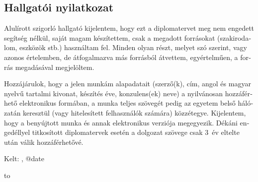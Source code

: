 \begin{otherlanguage}{magyar}

  \chapter*{Hallgatói nyilatkozat}
  \thispagestyle{plain}

  Alulírott \textbf{\authorihun} szigorló hallgató kijelentem, hogy ezt a diplomatervet meg nem engedett segítség nélkül, saját magam készítettem, csak a megadott forrásokat (szakirodalom, eszközök stb.) használtam fel. Minden olyan részt, melyet szó szerint, vagy azonos értelemben, de átfogalmazva más forrásból átvettem, egyértelműen, a forrás megadásával megjelöltem.

  Hozzájárulok, hogy a jelen munkám alapadatait (szerző(k), cím, angol és magyar nyelvű tartalmi kivonat, készítés éve, konzulens(ek) neve) a   nyilvánosan hozzáférhető elektronikus formában, a munka teljes szövegét pedig az egyetem belső hálózatán keresztül (vagy hitelesített felhasználók számára) közzétegye. Kijelentem, hogy a benyújtott munka és annak elektronikus verziója megegyezik. Dékáni engedéllyel titkosított diplomatervek esetén a dolgozat szövege csak 3~év eltelte után válik hozzáférhetővé.

  \vspace{4ex}

  \noindent Kelt: \viktdklocation, \csname @date\endcsname

  \vspace{20ex}

  \hfill\begin{minipage}{0.4\linewidth}
    \centering\hbox to \par
    \centering\authorihun\par
  \end{minipage}

\end{otherlanguage}


